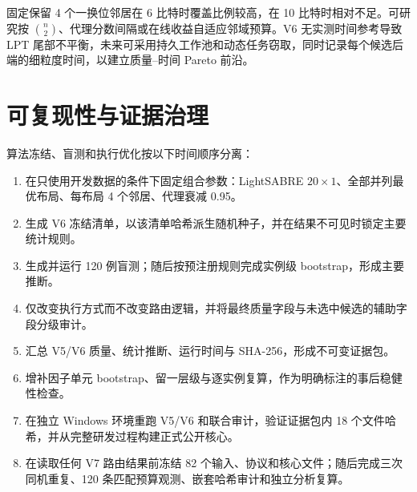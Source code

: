 \documentclass[11pt,a4paper]{article}
\begin{document}
固定保留 4 个一换位邻居在 6 比特时覆盖比例较高，在 10 比特时相对不足。可研究按 $\binom n2$、代理分数间隔或在线收益自适应邻域预算。V6 无实测时间参考导致 LPT 尾部不平衡，未来可采用持久工作池和动态任务窃取，同时记录每个候选后端的细粒度时间，以建立质量--时间 Pareto 前沿。

\section{可复现性与证据治理}

算法冻结、盲测和执行优化按以下时间顺序分离：

\begin{enumerate}[label=\textbf{步骤 \arabic*:},leftmargin=5em,itemsep=0.35em]
  \item 在只使用开发数据的条件下固定组合参数：LightSABRE $20\times1$、全部并列最优布局、每布局 4 个邻居、代理衰减 0.95。
  \item 生成 V6 冻结清单，以该清单哈希派生随机种子，并在结果不可见时锁定主要统计规则。
  \item 生成并运行 120 例盲测；随后按预注册规则完成实例级 bootstrap，形成主要推断。
  \item 仅改变执行方式而不改变路由逻辑，并将最终质量字段与未选中候选的辅助字段分级审计。
  \item 汇总 V5/V6 质量、统计推断、运行时间与 SHA-256，形成不可变证据包。
  \item 增补因子单元 bootstrap、留一层级与逐实例复算，作为明确标注的事后稳健性检查。
  \item 在独立 Windows 环境重跑 V5/V6 和联合审计，验证证据包内 18 个文件哈希，并从完整研发过程构建正式公开核心。
  \item 在读取任何 V7 路由结果前冻结 82 个输入、协议和核心文件；随后完成三次同机重复、120 条匹配预算观测、嵌套哈希审计和独立分析复算。
\end{enumerate}
\end{document}
